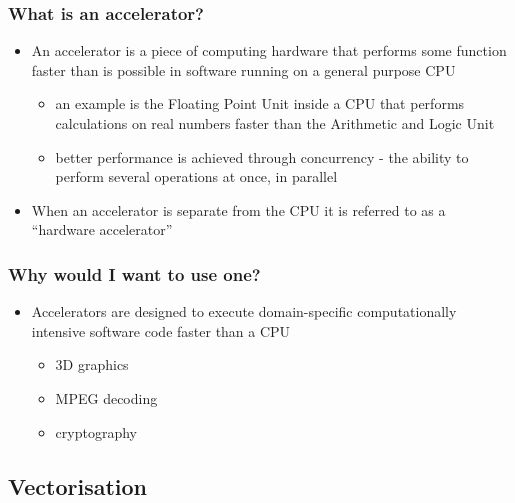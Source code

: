 \subsubsection{What is an accelerator?}\label{what-is-an-accelerator}

\begin{itemize}
\itemsep1pt\parskip0pt
\item
  An accelerator is a piece of computing hardware that performs some
  function faster than is possible in software running on a general
  purpose CPU

  \begin{itemize}
  \itemsep1pt\parskip0pt
  \item
    an example is the Floating Point Unit inside a CPU that performs
    calculations on real numbers faster than the Arithmetic and Logic
    Unit
  \item
    better performance is achieved through concurrency - the ability to
    perform several operations at once, in parallel
  \end{itemize}
\item
  When an accelerator is separate from the CPU it is referred to as a
  ``hardware accelerator''
\end{itemize}

\subsubsection{Why would I want to use
one?}\label{why-would-i-want-to-use-one}

\begin{itemize}
\itemsep1pt\parskip0pt
\item
  Accelerators are designed to execute domain-specific computationally
  intensive software code faster than a CPU

  \begin{itemize}
  \itemsep1pt\parskip0pt
  \item
    3D graphics
  \item
    MPEG decoding
  \item
    cryptography
  \end{itemize}
\end{itemize}

\subsection{Vectorisation}\label{vectorisation}

